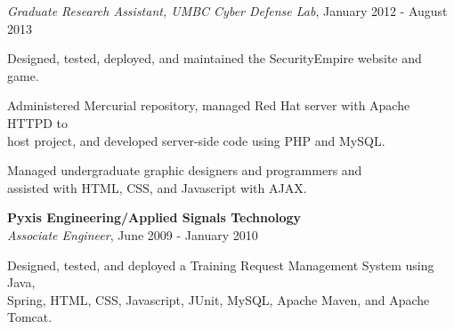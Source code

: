 \btab \textit{Graduate Research Assistant, UMBC Cyber Defense Lab}, January 2012 - August 2013\\
\begin{my_list}
\item Designed, tested, deployed, and maintained the SecurityEmpire website and game.
\item Administered Mercurial repository, managed Red Hat server with Apache HTTPD to\\ \tab \tab host project, and developed server-side code using PHP and MySQL.
\item Managed undergraduate graphic designers and programmers and\\ \tab \tab assisted with HTML, CSS, and Javascript with AJAX.
\end{my_list}


\atab \textbf{Pyxis Engineering/Applied Signals Technology}\\
\btab \textit{Associate Engineer}, June 2009 - January 2010\\
\begin{my_list}
\item Designed, tested, and deployed a Training Request Management System using Java,\\ \tab \tab  Spring, HTML, CSS, Javascript, JUnit, MySQL, Apache Maven, and Apache Tomcat.
\end{my_list}
\medskip


